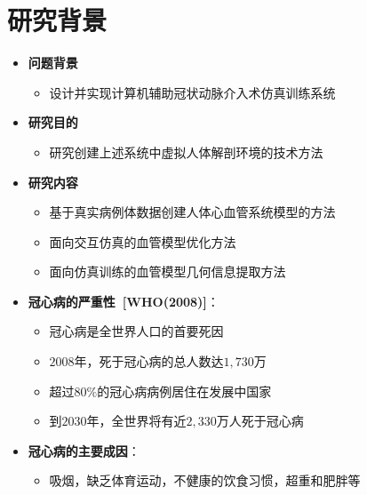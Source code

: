 \section{研究背景}

\begin{frame}
\begin{itemize}
\item \textbf{问题背景}
\begin{itemize}
\item 设计并实现计算机辅助冠状动脉介入术仿真训练系统
\end{itemize}
\end{itemize}
\begin{itemize}
\pause \item \textbf{研究目的}
\begin{itemize}
\item 研究创建上述系统中虚拟人体解剖环境的技术方法
\end{itemize}
\end{itemize}
\begin{itemize}
\pause \item \textbf{研究内容}
\begin{itemize}
\item 基于真实病例体数据创建人体心血管系统模型的方法
\item 面向交互仿真的血管模型优化方法
\item 面向仿真训练的血管模型几何信息提取方法
\end{itemize}
\end{itemize}
\end{frame}

\begin{frame}
\begin{itemize}
\item \textbf{冠心病的严重性~[WHO(2008)]}：
\begin{itemize}
\pause \item 冠心病是全世界人口的首要死因
\item $2008$年，死于冠心病的总人数达$1,730$万
\item 超过$80 \%$的冠心病病例居住在发展中国家
\item 到$2030$年，全世界将有近$2,330$万人死于冠心病
\end{itemize}
\end{itemize}
\begin{itemize}
\pause \item \textbf{冠心病的主要成因}：
\begin{itemize}
\item 吸烟，缺乏体育运动，不健康的饮食习惯，超重和肥胖等
\end{itemize}
\end{itemize}
\end{frame}

